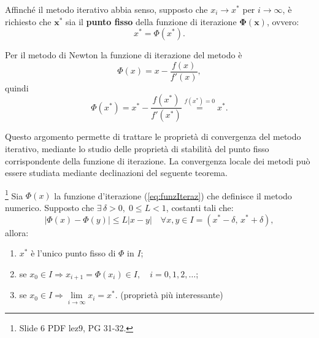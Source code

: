 Affinché il metodo iterativo abbia senso, supposto che $x_i\rightarrow x^*$ per $i\rightarrow\infty$, è richiesto che $\boldsymbol{x^*}$ sia il \textbf{punto fisso} della funzione di iterazione $\boldsymbol{\Phi(x)}$, ovvero:
\begin{equation*}
	x^*=\Phi (x^*).
\end{equation*}

\begin{definition}
	Per il metodo di Newton la funzione di iterazione del metodo è
	\begin{equation}\label{eq:funzIterazNewton}
		\Phi (x)=x-\frac{f(x)}{f'(x)},
	\end{equation}
	quindi
	\begin{equation*}
		\Phi (x^*)=x^*-\frac{f(x^*)}{f'(x^*)}\overset{f(x^*)=0}{=}x^*.
	\end{equation*}
\end{definition}

Questo argomento permette di trattare le proprietà di convergenza del metodo iterativo, mediante lo studio delle proprietà di stabilità del punto fisso corrispondente della funzione di iterazione. La convergenza locale dei metodi può essere studiata mediante declinazioni del seguente teorema.

\begin{theorem}\label{th:puntofisso}
	\footnote{Slide 6 PDF lez9, PG 31-32.}
	Sia $\Phi(x)$ la funzione d'iterazione (\ref{eq:funzIteraz}) che definisce il metodo numerico. Supposto che $\exists\,\delta >0,\; 0\leq L<1$, costanti tali che:
	\begin{equation*}
		|\Phi (x)-\Phi (y)|\leq L|x-y| \quad\forall x,y \in I=(x^*-\delta,\, x^*+\delta),
	\end{equation*}
	allora:
	\begin{enumerate}
		\item $x^*$ è l'unico punto fisso di $\Phi$ in $I$;
		\item se $x_0 \in I\Rightarrow x_{i+1} = \Phi(x_i)\in I,\quad i=0,1,2,\hdots$;
		\item se $x_0\in I \Rightarrow \underset{{i\to\infty}}{\lim}{x_i}=x^*$. (proprietà più interessante)
	\end{enumerate}
\end{theorem}

